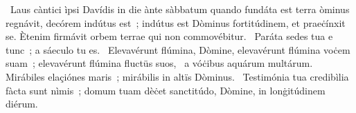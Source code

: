 {~Laus càntici ìpsi Davídis in die ànte sàbbatum quando fundáta est terra}
{%
òminus regnávit, decórem indútus est~; indútus est Dòminus fortitúdinem, et praeċínxit se. Ètenim firmávit orbem terrae qui non commovébitur.
~Paráta sedes tua e tunc~; a sáeculo tu es.
~Elevavérunt flúmina, Dòmine, elevavérunt flúmina voċem suam~; elevavérunt flúmina fluctüs suos,
~a vóċibus aquárum multárum. Mirábiles elaçiónes maris~; mirábilis in altïs Dòminus.
~Testimónia tua credibìlia fàcta sunt nìmis~; domum tuam dèċet sanctitúdo, Dòmine, in lonġitúdinem diérum.}
